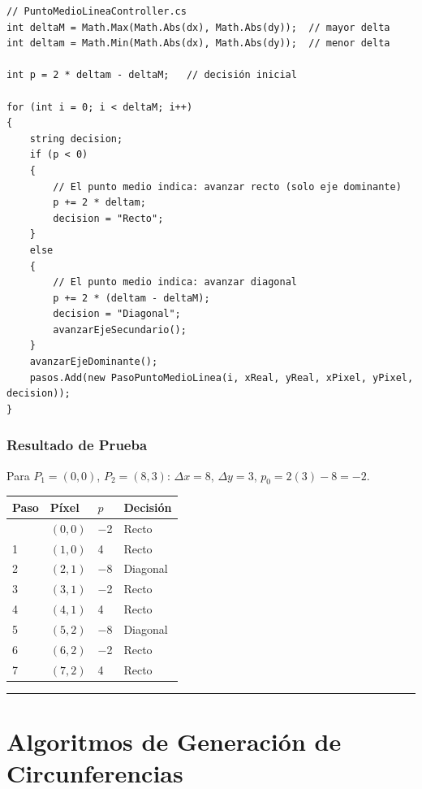 \documentclass[
  spanish,
  a4paper,
  12pt,
]{article}
\newcounter{none} %
\begin{document}
\begin{lstlisting}
// PuntoMedioLineaController.cs
int deltaM = Math.Max(Math.Abs(dx), Math.Abs(dy));  // mayor delta
int deltam = Math.Min(Math.Abs(dx), Math.Abs(dy));  // menor delta

int p = 2 * deltam - deltaM;   // decisión inicial

for (int i = 0; i < deltaM; i++)
{
    string decision;
    if (p < 0)
    {
        // El punto medio indica: avanzar recto (solo eje dominante)
        p += 2 * deltam;
        decision = "Recto";
    }
    else
    {
        // El punto medio indica: avanzar diagonal
        p += 2 * (deltam - deltaM);
        decision = "Diagonal";
        avanzarEjeSecundario();
    }
    avanzarEjeDominante();
    pasos.Add(new PasoPuntoMedioLinea(i, xReal, yReal, xPixel, yPixel, decision));
}
\end{lstlisting}

\subsubsection{Resultado de Prueba}\label{resultado-de-prueba-2}

Para \(P_1=(0,0)\), \(P_2=(8,3)\): \(\Delta x=8\), \(\Delta y=3\),
\(p_0 = 2(3)-8 = -2\).

{\def\LTcaptype{none} %
\begin{longtable}[]{@{}llll@{}}
\toprule\noalign{}
Paso & Píxel & \(p\) & Decisión \\
\midrule\noalign{}
\endhead
\bottomrule\noalign{}
\endlastfoot
0 & \((0,0)\) & −2 & Recto \\
1 & \((1,0)\) & 4 & Recto \\
2 & \((2,1)\) & −8 & Diagonal \\
3 & \((3,1)\) & −2 & Recto \\
4 & \((4,1)\) & 4 & Recto \\
5 & \((5,2)\) & −8 & Diagonal \\
6 & \((6,2)\) & −2 & Recto \\
7 & \((7,2)\) & 4 & Recto \\
\end{longtable}
}

\begin{center}\rule{0.5\linewidth}{0.5pt}\end{center}

\section{Algoritmos de Generación de
Circunferencias}\label{algoritmos-de-generaciuxf3n-de-circunferencias}
\end{document}
